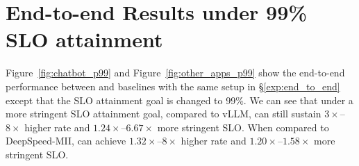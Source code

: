 \section{End-to-end Results under 99\% SLO attainment}
\label{appendix:end_to_end_p99}
Figure~\ref{fig:chatbot_p99} and Figure~\ref{fig:other_apps_p99} show the end-to-end performance between \sys and baselines with the same setup in \S\ref{exp:end_to_end} except that the SLO attainment goal is changed to 99\%. We can see that under a more stringent SLO attainment goal, compared to vLLM, \sys can still sustain $3\times$--$8\times$ higher rate and $1.24\times$--$6.67\times$ more stringent SLO. When compared to DeepSpeed-MII, \sys can achieve $1.32\times$--$8\times$ higher rate and $1.20\times$--$1.58\times$ more stringent SLO.


